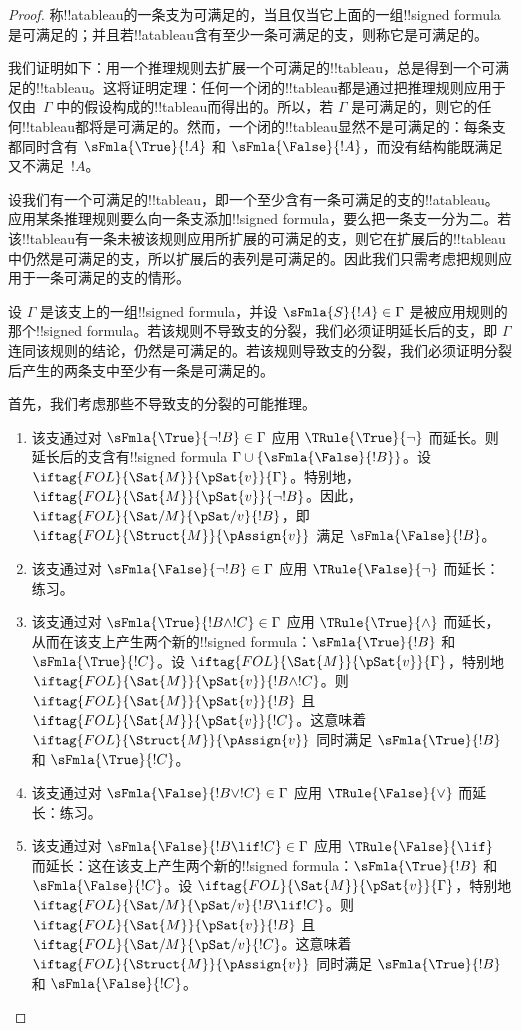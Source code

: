 \documentclass[../../../include/open-logic-section]{subfiles}
\begin{document}
\begin{proof}
称!!a{tableau}的一条支为可满足的，当且仅当它上面的一组!!{signed formula}是可满足的；并且若!!a{tableau}含有至少一条可满足的支，则称它是可满足的。

我们证明如下：用一个推理规则去扩展一个可满足的!!{tableau}，总是得到一个可满足的!!{tableau}。这将证明定理：任何一个闭的!!{tableau}都是通过把推理规则应用于仅由~$\Gamma$ 中的假设构成的!!{tableau}而得出的。所以，若 $\Gamma$ 是可满足的，则它的任何!!{tableau}都将是可满足的。然而，一个闭的!!{tableau}显然不是可满足的：每条支都同时含有
$\sFmla{\True}{!A}$ 和 $\sFmla{\False}{!A}$，而没有结构能既满足又不满足~$!A$。

设我们有一个可满足的!!{tableau}，即一个至少含有一条可满足的支的!!a{tableau}。应用某条推理规则要么向一条支添加!!{signed formula}，要么把一条支一分为二。若该!!{tableau}有一条未被该规则应用所扩展的可满足的支，则它在扩展后的!!{tableau}中仍然是可满足的支，所以扩展后的表列是可满足的。因此我们只需考虑把规则应用于一条可满足的支的情形。

设 $\Gamma$ 是该支上的一组!!{signed formula}，并设 $\sFmla{S}{!A} \in \Gamma$ 是被应用规则的那个!!{signed formula}。若该规则不导致支的分裂，我们必须证明延长后的支，即 $\Gamma$ 连同该规则的结论，仍然是可满足的。若该规则导致支的分裂，我们必须证明分裂后产生的两条支中至少有一条是可满足的。

首先，我们考虑那些不导致支的分裂的可能推理。
\begin{enumerate}
\item 该支通过对 $\sFmla{\True}{\lnot !B} \in \Gamma$ 应用 $\TRule{\True}{\lnot}$ 而延长。则延长后的支含有!!{signed formula} $\Gamma \cup
  \{\sFmla{\False}{!B}\}$。设
  $\iftag{FOL}{\Sat{M}}{\pSat{v}}{\Gamma}$。特别地，
  $\iftag{FOL}{\Sat{M}}{\pSat{v}}{\lnot !B}$。因此，
  $\iftag{FOL}{\Sat/{M}}{\pSat/{v}}{!B}$，即
  $\iftag{FOL}{\Struct{M}}{\pAssign{v}}$ 满足
  $\sFmla{\False}{!B}$。
\item 该支通过对 $\sFmla{\False}{\lnot !B} \in \Gamma$ 应用 $\TRule{\False}{\lnot}$ 而延长：练习。
\item 该支通过对 $\sFmla{\True}{!B \land !C} \in \Gamma$ 应用 $\TRule{\True}{\land}$ 而延长，从而在该支上产生两个新的!!{signed formula}：$\sFmla{\True}{!B}$ 和
  $\sFmla{\True}{!C}$。设
  $\iftag{FOL}{\Sat{M}}{\pSat{v}}{\Gamma}$，特别地
  $\iftag{FOL}{\Sat{M}}{\pSat{v}}{!B \land !C}$。则
  $\iftag{FOL}{\Sat{M}}{\pSat{v}}{!B}$ 且
  $\iftag{FOL}{\Sat{M}}{\pSat{v}}{!C}$。这意味着
  $\iftag{FOL}{\Struct{M}}{\pAssign{v}}$ 同时满足
  $\sFmla{\True}{!B}$ 和 $\sFmla{\True}{!C}$。
\item 该支通过对 $\sFmla{\False}{!B \lor !C} \in \Gamma$ 应用 $\TRule{\False}{\lor}$ 而延长：练习。
\item 该支通过对 $\sFmla{\False}{!B \lif !C} \in \Gamma$ 应用 $\TRule{\False}{\lif}$ 而延长：这在该支上产生两个新的!!{signed formula}：$\sFmla{\True}{!B}$ 和
  $\sFmla{\False}{!C}$。设
  $\iftag{FOL}{\Sat{M}}{\pSat{v}}{\Gamma}$，特别地
  $\iftag{FOL}{\Sat/{M}}{\pSat/{v}}{!B \lif !C}$。则
  $\iftag{FOL}{\Sat{M}}{\pSat{v}}{!B}$ 且
  $\iftag{FOL}{\Sat/{M}}{\pSat/{v}}{!C}$。这意味着
  $\iftag{FOL}{\Struct{M}}{\pAssign{v}}$ 同时满足
  $\sFmla{\True}{!B}$ 和 $\sFmla{\False}{!C}$。


\end{enumerate}
\end{proof}
\end{document}

